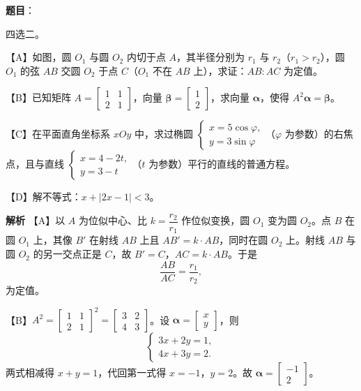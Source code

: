 \begin{answer}

\textbf{题目}：

四选二。

【A】如图，圆 $O_1$ 与圆 $O_2$ 内切于点 $A$，其半径分别为 $r_1$ 与 $r_2$（$r_1>r_2$），圆 $O_1$ 的弦 $AB$ 交圆 $O_2$ 于点 $C$（$O_1$ 不在 $AB$ 上），求证：$AB:AC$ 为定值。
\nopagebreak[4]
\begin{center}\end{center}
\nopagebreak[4]
【B】已知矩阵 $A=\begin{bmatrix}1&1\\2&1\end{bmatrix}$，向量 $\boldsymbol\beta=\begin{bmatrix}1\\2\end{bmatrix}$，求向量 $\boldsymbol\alpha$，使得 $A^2\boldsymbol\alpha=\boldsymbol\beta$。

【C】在平面直角坐标系 $xOy$ 中，求过椭圆 $\begin{cases}x=5\cos\varphi,\\y=3\sin\varphi\end{cases}$（$\varphi$ 为参数）的右焦点，且与直线 $\begin{cases}x=4-2t,\\y=3-t\end{cases}$（$t$ 为参数）平行的直线的普通方程。

【D】解不等式：$x+|2x-1|<3$。

\textbf{解析}
【A】以 $A$ 为位似中心、比 $k=\dfrac{r_2}{r_1}$ 作位似变换，圆 $O_1$ 变为圆 $O_2$。点 $B$ 在圆 $O_1$ 上，其像 $B'$ 在射线 $AB$ 上且 $AB'=k\cdot AB$，同时在圆 $O_2$ 上。射线 $AB$ 与圆 $O_2$ 的另一交点正是 $C$，故 $B'=C$，$AC=k\cdot AB$。于是
\nopagebreak[4]
\[\frac{AB}{AC}=\frac{r_1}{r_2},\]
为定值。

【B】$A^2=\begin{bmatrix}1&1\\2&1\end{bmatrix}^2=\begin{bmatrix}3&2\\4&3\end{bmatrix}$。设 $\boldsymbol\alpha=\begin{bmatrix}x\\y\end{bmatrix}$，则
\nopagebreak[4]
\[\begin{cases}3x+2y=1,\\4x+3y=2.\end{cases}\]
两式相减得 $x+y=1$，代回第一式得 $x=-1$，$y=2$。故 $\boldsymbol\alpha=\begin{bmatrix}-1\\2\end{bmatrix}$。


\end{answer}
